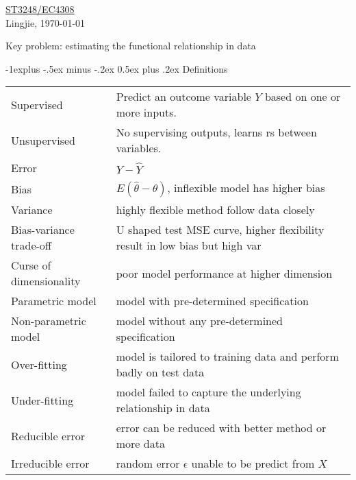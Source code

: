 \documentclass[a4paper,12pt,landscape]{article}
\makeatletter
\renewcommand{\subsection}{\@startsection{subsection}{2}{0mm}%
                                {-1explus -.5ex minus -.2ex}%
                                {0.5ex plus .2ex}%
                                {\normalfont\normalsize\bfseries\color{blue}}}
\makeatother
\begin{document}
\raggedright
\footnotesize
\begin{multicols}{3}


\setlength{\columnseprule}{0.25pt}
\setlength{\premulticols}{1pt}
\setlength{\postmulticols}{1pt}
\setlength{\multicolsep}{1pt}
\setlength{\columnsep}{2pt}

\begin{center}
     \Large{\underline{ST3248/EC4308}} \\
     {Lingjie, \today}
\end{center}

Key problem: estimating the functional relationship in data

\subsection{Definitions}

\begin{tabulary}{\linewidth}{l @{ := } L}
    Supervised & Predict an outcome variable $Y$ based on one or more inputs.\\
    Unsupervised & No supervising outputs, learns rs between variables.\\
    Error & $Y - \hat Y$\\
    Bias & $E(\hat\theta - \theta)$, inflexible model has higher bias\\
    Variance & highly flexible method follow data closely\\
    Bias-variance trade-off & U shaped test MSE curve, higher flexibility result in low bias but high var\\
    Curse of dimensionality & poor model performance at higher dimension\\
    Parametric model & model with pre-determined specification\\
    Non-parametric model & model without any pre-determined specification\\
    Over-fitting & model is tailored to training data and perform badly on test data\\
    Under-fitting & model failed to capture the underlying relationship in data\\
    Reducible error & error can be reduced with better method or more data\\
    Irreducible error & random error $\epsilon$ unable to be predict from $X$
\end{tabulary}


\end{multicols}
\end{document}
